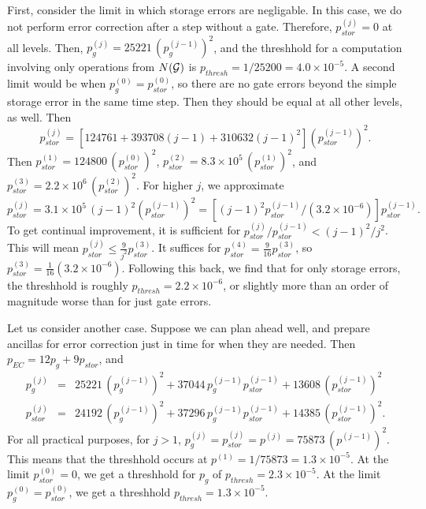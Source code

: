 \documentclass{report}
\newcommand{\G}{{\cal G}}
\newcommand{\pgj}[1]{p_g^{({#1})}}
\newcommand{\psj}[1]{p_{stor}^{({#1})}}
\begin{document}
First, consider the limit in which storage errors are negligable.  In this 
case, we do not perform error correction after a step without a gate.  
Therefore, $\psj{j} = 0$ at all levels.  Then, $\pgj{j} = 25221\,(\pgj{j-1})^2$,
and the threshhold for a computation involving only operations from $N(\G)$ is 
$p_{thresh} = 1/25200 = 4.0 \times 10^{-5}$.  A second limit would be when 
$\pgj{0} = \psj{0}$, so there are no gate errors beyond the simple storage 
error in the same time step.  Then they should be equal at all other levels, 
as well.  Then
\begin{equation}
\psj{j} = \left[124761 + 393708 (j-1) + 310632 (j-1)^2 \right] (\psj{j-1})^2.
\end{equation}
Then $\psj{1} = 124800\,(\psj{0})^2$, $\psj{2} = 8.3 \times 10^5\,(\psj{1})^2$, 
and $\psj{3} = 2.2 \times 10^6\,(\psj{2})^2$.  For higher $j$, we approximate 
\begin{equation}
\psj{j} = 3.1 \times 10^5\,(j-1)^2 (\psj{j-1})^2 = \left[ (j-1)^2 
\psj{j-1}/ (3.2 \times 10^{-6}) \right] \psj{j-1}.
\end{equation}
To get continual improvement, it is sufficient for $\psj{j}/\psj{j-1} < (j-
1)^2/j^2$.  This will mean $\psj{j} \leq \frac{9}{j^2} \psj{3}$.  It suffices 
for $\psj{4} = \frac{9}{16} \psj{3}$, so $\psj{3} = \frac{1}{16} (3.2 \times 
10^{-6})$.  Following this back, we find that for only storage errors, the 
threshhold is roughly $p_{thresh} = 2.2 \times 10^{-6}$, or slightly more 
than an order of magnitude worse than for just gate errors.

Let us consider another case.  Suppose we can plan ahead well, and 
prepare ancillas for error correction just in time for when they are needed.  
Then $p_{EC} = 12 p_g + 9 p_{stor}$, and
\begin{eqnarray}
\pgj{j} & = & 25221\,(\pgj{j-1})^2 + 37044\,\pgj{j-1} \psj{j-1} + 13608\,
(\psj{j-1})^2 \\
\psj{j} & = & 24192\,(\pgj{j-1})^2 + 37296\,\pgj{j-1} \psj{j-1} + 14385\,
(\psj{j-1})^2.
\end{eqnarray}
For all practical purposes, for $j > 1$, $\pgj{j} = \psj{j} = p^{(j)} = 75873\, 
(p^{(j-1)})^2$.  This means that the threshhold occurs at $p^{(1)} = 1/75873 = 
1.3 \times 10^{-5}$.  At the limit $\psj{0} = 0$, we get a threshhold for 
$p_g$ of $p_{thresh} = 2.3 \times 10^{-5}$.  At the limit $\pgj{0} = \psj{0}$, 
we get a threshhold $p_{thresh} = 1.3 \times 10^{-5}$.
\end{document}
